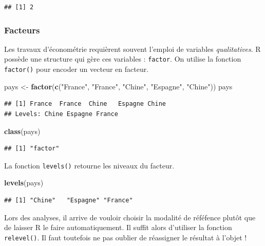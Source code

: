 \documentclass[
  11pt,
]{book}
\newenvironment{Shaded}{\begin{snugshade}}{\end{snugshade}}
\newcommand{\KeywordTok}[1]{\textcolor[rgb]{0.13,0.29,0.53}{\textbf{#1}}}
\newcommand{\NormalTok}[1]{#1}
\newcommand{\StringTok}[1]{\textcolor[rgb]{0.31,0.60,0.02}{#1}}
\numberwithin{equation}{section}
\numberwithin{countremarque}{section}
\begin{document}
\begin{lstlisting}
## [1] 2
\end{lstlisting}

\hypertarget{facteurs}{%
\subsubsection{Facteurs}\label{facteurs}}

Les travaux d'économétrie requièrent souvent l'emploi de variables \emph{qualitatives}. R possède une structure qui gère ces variables : \texttt{factor}. On utilise la fonction \texttt{factor()} pour encoder un vecteur en facteur.

\begin{Shaded}
\begin{Highlighting}[]
\NormalTok{pays \textless{}{-}}\StringTok{ }\KeywordTok{factor}\NormalTok{(}\KeywordTok{c}\NormalTok{(}\StringTok{"France"}\NormalTok{, }\StringTok{"France"}\NormalTok{, }\StringTok{"Chine"}\NormalTok{, }\StringTok{"Espagne"}\NormalTok{, }\StringTok{"Chine"}\NormalTok{))}
\NormalTok{pays}
\end{Highlighting}
\end{Shaded}

\begin{lstlisting}
## [1] France  France  Chine   Espagne Chine  
## Levels: Chine Espagne France
\end{lstlisting}

\begin{Shaded}
\begin{Highlighting}[]
\KeywordTok{class}\NormalTok{(pays)}
\end{Highlighting}
\end{Shaded}

\begin{lstlisting}
## [1] "factor"
\end{lstlisting}

La fonction \texttt{levels()} retourne les niveaux du facteur.

\begin{Shaded}
\begin{Highlighting}[]
\KeywordTok{levels}\NormalTok{(pays)}
\end{Highlighting}
\end{Shaded}

\begin{lstlisting}
## [1] "Chine"   "Espagne" "France"
\end{lstlisting}

Lors des analyses, il arrive de vouloir choisir la modalité de réféfence plutôt que de laisser R le faire automatiquement. Il suffit alors d'utiliser la fonction \texttt{relevel()}. Il faut toutefois ne pas oublier de réassigner le résultat à l'objet !
\end{document}
